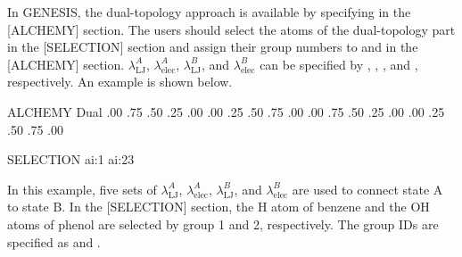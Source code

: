 \documentclass[a4paper,11pt,oneside,english]{sphinxmanual}
\begin{document}
In GENESIS, the dual-topology approach is available by specifying  in the {[}ALCHEMY{]} section.
The users should select the atoms of the dual-topology part in the {[}SELECTION{]} section and assign their group numbers to  and  in the {[}ALCHEMY{]} section.
\(\lambda_{\text{LJ}}^{A}\), \(\lambda_{\text{elec}}^{A}\), \(\lambda_{\text{LJ}}^{B}\), and \(\lambda_{\text{elec}}^{B}\) can be specified by , , , and , respectively.
An example is shown below.

\begin{sphinxVerbatim}[commandchars=\\\{\}]
\PYG{o}{[}ALCHEMY\PYG{o}{]}
  Dual
           
           
       .00 .75 .50 .25 .00
       .00 .25 .50 .75 .00
       .00 .75 .50 .25 .00
       .00 .25 .50 .75 .00

\PYG{o}{[}SELECTION\PYG{o}{]}
        ai:1    
        ai:2\PYGZhy{}3  
\end{sphinxVerbatim}

In this example, five sets of \(\lambda_{\text{LJ}}^{A}\), \(\lambda_{\text{elec}}^{A}\), \(\lambda_{\text{LJ}}^{B}\), and \(\lambda_{\text{elec}}^{B}\) are used to connect state A to state B.
In the {[}SELECTION{]} section, the H atom of benzene and the OH atoms of phenol are selected by group 1 and 2, respectively.
The group IDs are specified as  and .
\end{document}
